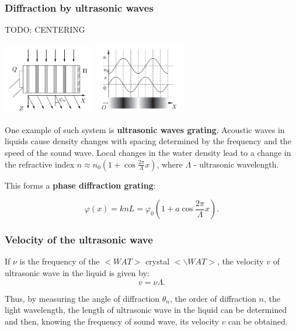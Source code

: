 \documentclass{beamer}
\begin{document}
	\begin{frame}
		\frametitle{Diffraction by ultrasonic waves}
		
		TODO: CENTERING
		
		\includegraphics[width=4cm]{res/acoustic_grating.png}
		\includegraphics[width=4cm]{res/n_x.png}
		
		One example of such system is \textbf{ultrasonic waves grating}. 
		Acoustic waves in liquids cause density changes with spacing determined by the
		frequency and the speed of the sound wave.
		Local changes in the water density lead to a change in the refractive index $n \approx n_0 (1 + \cos{\frac{2\pi}{\Lambda}x})$, where $\Lambda$ - ultrasonic wavelength.
		
		This forms a \textbf{phase diffraction grating}:
		
		\begin{equation}
			\varphi(x) = knL = \varphi_0 (1 + a \cos{\frac{2\pi}{\Lambda}x}).
			\label{eq:diffraction}
		\end{equation}
	\end{frame}

	
	\begin{frame}
		\frametitle{Velocity of the ultrasonic wave}
		
		If $\nu$ is the frequency of the $<WAT>$ crystal $<\backslash WAT>$, the velocity $v$ of ultrasonic wave in the
		liquid is given by:
		\begin{equation}
			v = \nu \Lambda.
			\label{eq:vel}
		\end{equation}
		
		Thus, by measuring the angle of diffraction $\theta_n$, the order of diffraction $n$, the
		light wavelength, the length of ultrasonic wave in the liquid can be determined
		and then, knowing the frequency of sound wave, its velocity $v$ can be obtained. 
	\end{frame}
\end{document}
